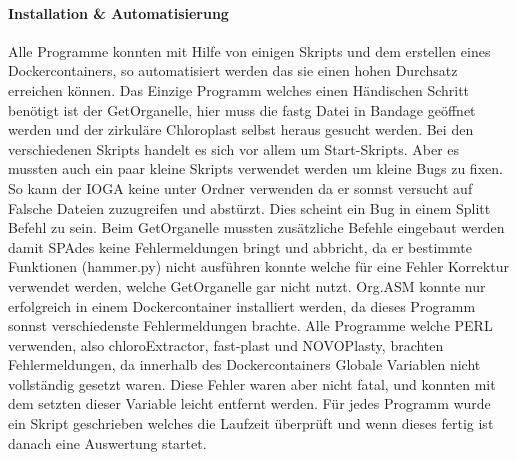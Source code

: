 \documentclass{scrartcl}
\begin{document}
\paragraph{Installation \& Automatisierung}
\label{sec-3-1-2-1}
Alle Programme konnten mit Hilfe von einigen Skripts und dem erstellen eines Dockercontainers, so 
automatisiert werden das sie einen hohen Durchsatz erreichen können. Das Einzige Programm welches
einen Händischen Schritt benötigt ist der GetOrganelle, hier muss die fastg Datei in Bandage
geöffnet werden und der zirkuläre Chloroplast selbst heraus gesucht werden.
Bei den verschiedenen Skripts handelt es sich vor allem um Start-Skripts. Aber es mussten auch ein paar 
kleine Skripts verwendet werden um kleine Bugs zu fixen. So kann der IOGA keine unter Ordner verwenden da er sonnst
versucht auf Falsche Dateien zuzugreifen und abstürzt. Dies scheint ein Bug in einem Splitt Befehl zu sein. Beim GetOrganelle mussten
zusätzliche Befehle eingebaut werden damit SPAdes keine Fehlermeldungen bringt und abbricht, da er bestimmte Funktionen (hammer.py) nicht ausführen konnte
welche für eine Fehler Korrektur verwendet werden, welche GetOrganelle gar nicht nutzt. Org.ASM konnte nur erfolgreich in einem Dockercontainer
installiert werden, da dieses Programm sonnst verschiedenste Fehlermeldungen brachte. Alle Programme welche PERL verwenden, also
chloroExtractor, fast-plast und NOVOPlasty, brachten Fehlermeldungen, da innerhalb des Dockercontainers Globale Variablen nicht vollständig gesetzt waren. 
Diese Fehler waren aber nicht fatal, und konnten mit dem setzten dieser Variable leicht entfernt werden. 
Für jedes Programm wurde ein Skript geschrieben welches die Laufzeit überprüft und wenn dieses fertig ist danach eine Auswertung startet.
\end{document}

